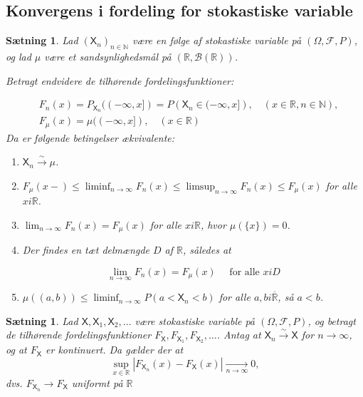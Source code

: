 \documentclass{article}
\newcommand{\R}{\mathbb{R}}
\newcommand{\1}{\mathbbm{1}}
\newcommand{\X}{\mathsf{X}}
\newcommand{\pfield}{(\Omega, \mathcal{F}, P)}
\theoremstyle{boxed}
\newtheorem{proposition}[theorem]{Sætning}
\begin{document}
\subsection{Konvergens i fordeling for stokastiske variable}
\begin{theorem-box}
    \begin{proposition}
        Lad $\left(\X_n\right)_{n \in \mathbb{N}}$ være en følge af stokastiske variable på $(\Omega, \mathcal{F}, P)$, og lad $\mu$ være et sandsynlighedsmål på $(\mathbb{R}, \mathcal{B}(\mathbb{R}))$.

Betragt endvidere de tilhørende fordelingsfunktioner:

$$
\begin{aligned}
& F_n(x)=P_{\X_n}((-\infty, x])=P\left(\X_n \in(-\infty, x]\right), \quad(x \in \mathbb{R}, n \in \mathbb{N}), \\
& F_\mu(x)=\mu((-\infty, x]), \quad(x \in \mathbb{R})
\end{aligned}
$$
Da er følgende betingelser ækvivalente:
\begin{enumerate}
    \item[\textnormal{(i)}] $\X_n \xrightarrow{\sim} \mu$.
    \item[\textnormal{(ii)}]$F_\mu(x-) \leq \liminf _{n \rightarrow \infty} F_n(x) \leq \limsup _{n \rightarrow \infty} F_n(x) \leq F_\mu(x)$ for alle $x i \mathbb{R}$.

    \item[\textnormal{(iii)}] $\lim _{n \rightarrow \infty} F_n(x)=F_\mu(x)$ for alle $x i \mathbb{R}$, hvor $\mu(\{x\})=0$.

    \item[\textnormal{(iv)}] Der findes en tæt delmængde $D$ af $\mathbb{R}$, således at

    $$
    \lim _{n \rightarrow \infty} F_n(x)=F_\mu(x) \quad \text { for alle } x i D
    $$
    \item[\textnormal{(v)}]  $\mu((a, b)) \leq \liminf _{n \rightarrow \infty} P\left(a<\X_n<b\right)$ for alle $a, b i \overline{\mathbb{R}}$, så $a<b$.
\end{enumerate}
    \end{proposition}
\end{theorem-box}
\begin{theorem-box}
    \begin{proposition}
        Lad $\X,\X_1,\X_2, \ldots$ være stokastiske variable på $\pfield$, og betragt de tilhørende fordelingsfunktioner $F_\X, F_{\X_1},F_{\X_2},\ldots$. Antag at $\X_n \xrightarrow{\sim} \X$ for $n\rightarrow \infty$, og at $F_\X$ er kontinuert. Da gælder der at 
        $$\sup_{x\in\R}\left|F_{\X_n}(x)-F_\X(x)\right|\xrightarrow[n\rightarrow \infty]{}0,$$
        dvs. $F_{\X_n}\rightarrow F_\X$ uniformt på $\R$
    \end{proposition}
\end{theorem-box}
\end{document}
